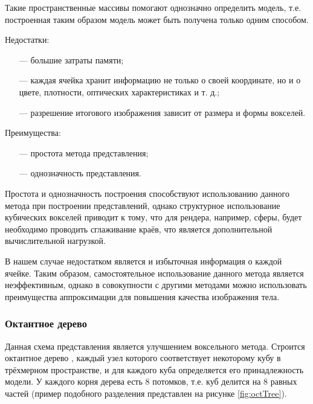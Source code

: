 Такие пространственные массивы помогают однозначно определить модель, т.е. построенная таким образом модель может быть получена только одним способом. 

Недостатки:
\begin{itemize}[leftmargin=1.6\parindent]
	\item[---] большие затраты памяти;
	\item[---] каждая ячейка хранит информацию не только о своей координате, но и о цвете, плотности, оптических характеристиках и т. д.;
	\item[---] разрешение итогового изображения зависит от размера и формы вокселей.
\end{itemize}

Преимущества:
\begin{itemize}[leftmargin=1.6\parindent]
	\item[---] простота метода представления;
	\item[---] однозначность представления.
\end{itemize}

Простота и однозначность построения способствуют использованию 
данного метода при построении представлений, однако структурное 
использование кубических вокселей приводит к тому, что для рендера, например, сферы, будет необходимо проводить сглаживание краёв, что 
является дополнительной вычислительной нагрузкой.

В нашем случае недостатком является и избыточная информация о 
каждой ячейке.
Таким образом, самостоятельное использование данного метода 
является неэффективным, однако в совокупности с другими методами можно 
использовать преимущества аппроксимации для повышения качества 
изображения тела.

\subsubsection{Октантное дерево}

Данная схема представления является улучшением воксельного метода. 
Строится октантное дерево \cite{numeric-octree}, каждый узел которого соответствует некоторому 
кубу в трёхмерном пространстве, и для каждого куба определяется его 
принадлежность модели.
У каждого корня дерева есть 8 потомков, т.е. куб 
делится на 8 равных частей (пример подобного разделения представлен на рисунке \ref{fig:octTree}).
\newpage

